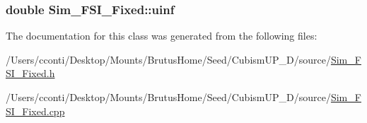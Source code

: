 \subsubsection[{uinf}]{\setlength{\rightskip}{0pt plus 5cm}double Sim\+\_\+\+F\+S\+I\+\_\+\+Fixed\+::uinf\hspace{0.3cm}{\ttfamily [protected]}}\label{class_sim___f_s_i___fixed_adbebdb69690216b89cf81339ac4a5e0e}


The documentation for this class was generated from the following files\+:\begin{DoxyCompactItemize}
\item 
/\+Users/cconti/\+Desktop/\+Mounts/\+Brutus\+Home/\+Seed/\+Cubism\+U\+P\+\_\+D/source/\hyperlink{_sim___f_s_i___fixed_8h}{Sim\+\_\+\+F\+S\+I\+\_\+\+Fixed.\+h}\item 
/\+Users/cconti/\+Desktop/\+Mounts/\+Brutus\+Home/\+Seed/\+Cubism\+U\+P\+\_\+D/source/\hyperlink{_sim___f_s_i___fixed_8cpp}{Sim\+\_\+\+F\+S\+I\+\_\+\+Fixed.\+cpp}\end{DoxyCompactItemize}
